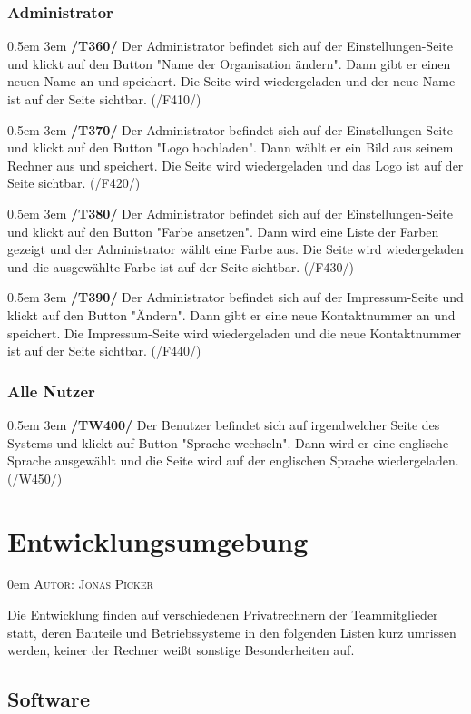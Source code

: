 \documentclass{article}
\makeatletter
\newcommand{\sectionauthor}[1]{
	{\parindent 0em \large \scshape Autor: #1 \par \nobreak \vspace*{2em}}
	\@afterheading
}
\newcommand{\specification}[3]{
	{\parindent 0.5em \hangindent 3em \hypertarget{spec:#1:#2}{\textbf{/#1#2/}} #3 \par \nobreak \vspace*{0.5em}}
}
\makeatother
\begin{document}
		\subsubsection{Administrator}
			\specification{T}{360}{Der Administrator befindet sich auf der Einstellungen-Seite und klickt auf den Button "Name der Organisation ändern". Dann gibt er einen neuen Name an und speichert. 
				Die Seite wird wiedergeladen und der neue Name ist auf der Seite sichtbar. (/F410/) }
			\specification{T}{370}{Der Administrator befindet sich auf der Einstellungen-Seite und klickt auf den Button "Logo hochladen". Dann wählt er ein Bild aus seinem Rechner aus und speichert. 
				Die Seite wird wiedergeladen und das Logo ist auf der Seite sichtbar. (/F420/)}
			\specification{T}{380}{Der Administrator befindet sich auf der Einstellungen-Seite und klickt auf den Button "Farbe ansetzen". Dann wird eine Liste der Farben gezeigt und der Administrator wählt eine Farbe aus. 
				Die Seite wird wiedergeladen und die ausgewählte Farbe ist auf der Seite sichtbar. (/F430/)}
			\specification{T}{390}{Der Administrator befindet sich auf der Impressum-Seite und klickt auf den Button "Ändern". Dann gibt er eine neue Kontaktnummer an und speichert. 
				Die Impressum-Seite wird wiedergeladen und die neue Kontaktnummer ist auf der Seite sichtbar. (/F440/)}
		\subsubsection{Alle Nutzer}
			\specification{TW}{400}{Der Benutzer befindet sich auf irgendwelcher Seite des Systems und klickt auf Button "Sprache wechseln". 
				Dann wird er eine englische Sprache ausgewählt und die Seite wird auf der englischen Sprache wiedergeladen. (/W450/) }

\newpage

\section{Entwicklungsumgebung} %
\sectionauthor{Jonas Picker}

Die Entwicklung finden auf verschiedenen Privatrechnern der Teammitglieder statt, deren Bauteile und Betriebssysteme in den folgenden Listen kurz umrissen werden, keiner der Rechner weißt sonstige Besonderheiten auf. 

\subsection{Software}
\end{document}
